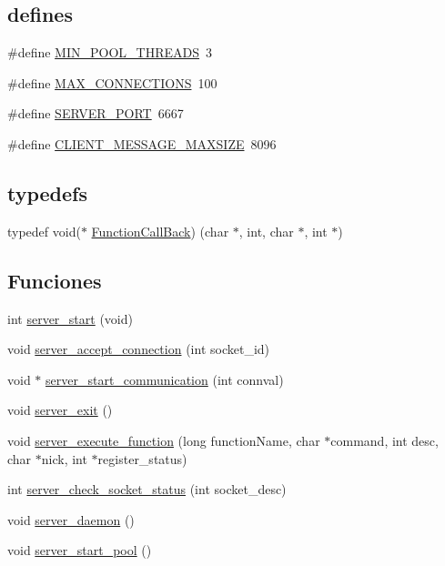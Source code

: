 \subsection*{\textquotesingle{}defines\textquotesingle{}}
\begin{DoxyCompactItemize}
\item 
\#define \hyperlink{G-2313-06-P1__server_8h_a80c7be19e867e55f90be3fa66cf65300}{M\+I\+N\+\_\+\+P\+O\+O\+L\+\_\+\+T\+H\+R\+E\+A\+DS}~3
\item 
\#define \hyperlink{G-2313-06-P1__server_8h_a053b7859476cc9867ec62c49e68d3fa1}{M\+A\+X\+\_\+\+C\+O\+N\+N\+E\+C\+T\+I\+O\+NS}~100
\item 
\#define \hyperlink{G-2313-06-P1__server_8h_ac42367fe5c999ec6650de83e9d72fe8c}{S\+E\+R\+V\+E\+R\+\_\+\+P\+O\+RT}~6667
\item 
\#define \hyperlink{G-2313-06-P1__server_8h_a97ed8e840fc4086fc86554e6d1277ca8}{C\+L\+I\+E\+N\+T\+\_\+\+M\+E\+S\+S\+A\+G\+E\+\_\+\+M\+A\+X\+S\+I\+ZE}~8096
\end{DoxyCompactItemize}
\subsection*{\textquotesingle{}typedefs\textquotesingle{}}
\begin{DoxyCompactItemize}
\item 
typedef void($\ast$ \hyperlink{G-2313-06-P1__server_8h_ae102cd0a63430b827183f70ce476a887}{Function\+Call\+Back}) (char $\ast$, int, char $\ast$, int $\ast$)
\end{DoxyCompactItemize}
\subsection*{Funciones}
\begin{DoxyCompactItemize}
\item 
int \hyperlink{G-2313-06-P1__server_8h_a85f40553bba77ada6c4329db58f68630}{server\+\_\+start} (void)
\item 
void \hyperlink{G-2313-06-P1__server_8h_ab201db206f26ab6fb26bb0e36dac4589}{server\+\_\+accept\+\_\+connection} (int socket\+\_\+id)
\item 
void $\ast$ \hyperlink{G-2313-06-P1__server_8h_a567404fb6edb67d9035359fef8e5acf3}{server\+\_\+start\+\_\+communication} (int connval)
\item 
void \hyperlink{G-2313-06-P1__server_8h_a0e947005d451a8f3bf3af01f54b59f11}{server\+\_\+exit} ()
\item 
void \hyperlink{G-2313-06-P1__server_8h_a775161328c3264fb8f96981f7a9c83ae}{server\+\_\+execute\+\_\+function} (long function\+Name, char $\ast$command, int desc, char $\ast$nick, int $\ast$register\+\_\+status)
\item 
int \hyperlink{G-2313-06-P1__server_8h_a64f1fffc5903ccf0350845cd21a95b6e}{server\+\_\+check\+\_\+socket\+\_\+status} (int socket\+\_\+desc)
\item 
void \hyperlink{G-2313-06-P1__server_8h_aa0e8000b12d9c52fc1e87847d00c9c47}{server\+\_\+daemon} ()
\item 
void \hyperlink{G-2313-06-P1__server_8h_a48d522cd984dc64ecd084f05416b1a94}{server\+\_\+start\+\_\+pool} ()
\end{DoxyCompactItemize}


